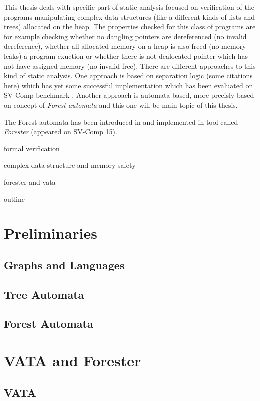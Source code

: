 This thesis deals with specific part of static analysis focused on verification of the programs manipulating
complex data structures (like a different kinds of lists and trees) allocated on the heap.
The properties checked for this class of programs are for example checking whether no dangling
pointers are dereferenced (no invalid dereference), whether all allocated memory on a heap is also freed (no memory leaks)
a program exuction or whether there is not dealocated pointer which has not have assigned memory (no invalid free).
There are different approaches to this kind of static analysis.
One approach is based on separation logic (some citations here) which has yet some successful implementation \cite{predator} which has been
evaluated on SV-Comp benchmark \cite{svcomp}.
Another approach is automata based, more precisly based on concept of \emph{Forest automata} and this one
will be main topic of this thesis.

The Forest automata has been introduced in \cite{forester} and implemented in tool called \emph{Forester} (appeared on SV-Comp 15).


\cite{Knuth}

formal verification

complex data structure and memory safety

forester and vata

outline

\chapter{Preliminaries}

\section{Graphs and Languages}
\section{Tree Automata}
\section{Forest Automata}

\chapter{VATA and Forester}

\section{VATA}

